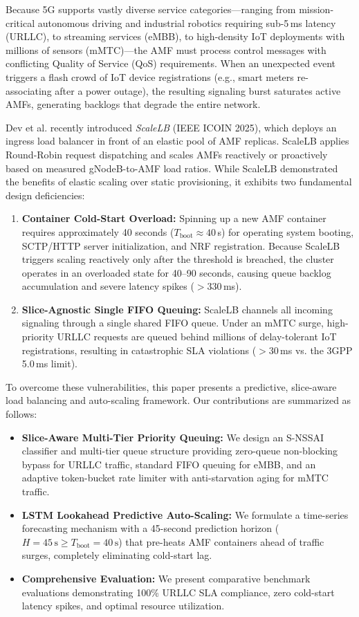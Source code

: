\documentclass[conference]{IEEEtran}
\begin{document}
Because 5G supports vastly diverse service categories—ranging from mission-critical autonomous driving and industrial robotics requiring sub-5\,ms latency (URLLC), to streaming services (eMBB), to high-density IoT deployments with millions of sensors (mMTC)—the AMF must process control messages with conflicting Quality of Service (QoS) requirements. When an unexpected event triggers a flash crowd of IoT device registrations (e.g., smart meters re-associating after a power outage), the resulting signaling burst saturates active AMFs, generating backlogs that degrade the entire network.

Dev et al. recently introduced \textit{ScaleLB} \cite{scalelb} (IEEE ICOIN 2025), which deploys an ingress load balancer in front of an elastic pool of AMF replicas. ScaleLB applies Round-Robin request dispatching and scales AMFs reactively or proactively based on measured gNodeB-to-AMF load ratios. While ScaleLB demonstrated the benefits of elastic scaling over static provisioning, it exhibits two fundamental design deficiencies:
\begin{enumerate}
    \item \textbf{Container Cold-Start Overload:} Spinning up a new AMF container requires approximately 40 seconds ($T_{\text{boot}} \approx 40$\,s) for operating system booting, SCTP/HTTP server initialization, and NRF registration. Because ScaleLB triggers scaling reactively only after the threshold is breached, the cluster operates in an overloaded state for 40--90 seconds, causing queue backlog accumulation and severe latency spikes ($>330$\,ms).
    \item \textbf{Slice-Agnostic Single FIFO Queuing:} ScaleLB channels all incoming signaling through a single shared FIFO queue. Under an mMTC surge, high-priority URLLC requests are queued behind millions of delay-tolerant IoT registrations, resulting in catastrophic SLA violations ($>30$\,ms vs. the 3GPP 5.0\,ms limit).
\end{enumerate}

To overcome these vulnerabilities, this paper presents a predictive, slice-aware load balancing and auto-scaling framework. Our contributions are summarized as follows:
\begin{itemize}
    \item \textbf{Slice-Aware Multi-Tier Priority Queuing:} We design an S-NSSAI classifier and multi-tier queue structure providing zero-queue non-blocking bypass for URLLC traffic, standard FIFO queuing for eMBB, and an adaptive token-bucket rate limiter with anti-starvation aging for mMTC traffic.
    \item \textbf{LSTM Lookahead Predictive Auto-Scaling:} We formulate a time-series forecasting mechanism with a 45-second prediction horizon ($H = 45\,\text{s} \ge T_{\text{boot}} = 40\,\text{s}$) that pre-heats AMF containers ahead of traffic surges, completely eliminating cold-start lag.
    \item \textbf{Comprehensive Evaluation:} We present comparative benchmark evaluations demonstrating 100\% URLLC SLA compliance, zero cold-start latency spikes, and optimal resource utilization.
\end{itemize}
\end{document}
